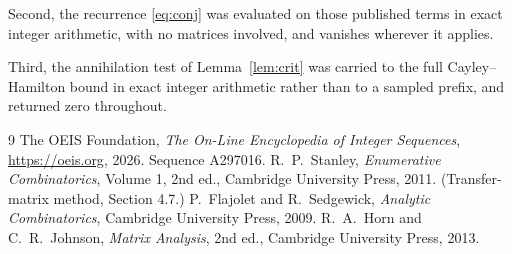 \documentclass[11pt,a4paper]{article}
\theoremstyle{plain}
\theoremstyle{definition}
\begin{document}
Second, the recurrence \eqref{eq:conj} was evaluated on those published terms in exact
integer arithmetic, with no matrices involved, and vanishes wherever it applies.

Third, the annihilation test of Lemma~\ref{lem:crit} was carried to the full
Cayley--Hamilton bound in exact integer arithmetic rather than to a sampled prefix, and
returned zero throughout.

\begin{thebibliography}{9}
 The OEIS Foundation, \emph{The On-Line Encyclopedia of Integer
Sequences}, \url{https://oeis.org}, 2026. Sequence A297016.
 R.~P.~Stanley, \emph{Enumerative Combinatorics}, Volume 1, 2nd ed.,
Cambridge University Press, 2011. (Transfer-matrix method, Section 4.7.)
 P.~Flajolet and R.~Sedgewick, \emph{Analytic Combinatorics}, Cambridge
University Press, 2009.
 R.~A.~Horn and C.~R.~Johnson, \emph{Matrix Analysis}, 2nd ed., Cambridge
University Press, 2013.
\end{thebibliography}
\end{document}

